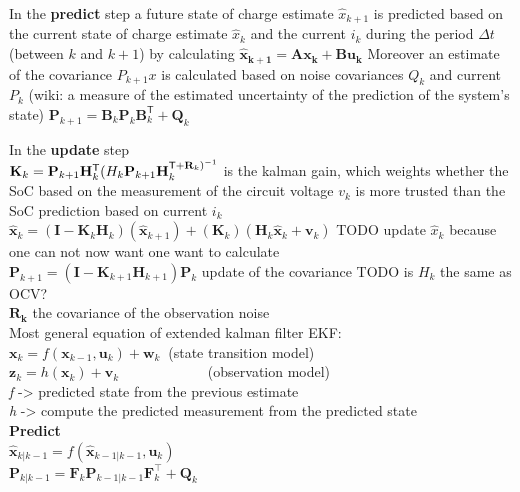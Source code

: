 In the \textbf{predict} step a future state of charge estimate  $\hat x_{k+1}$ is predicted based on the current state of charge estimate $\hat x_k$ and the current $i_k$ during the period $\Delta t$ (between $k$ and $k+1$) by calculating $ \mathbf{\hat x_{k+1}=Ax_{k}+Bu_{k}} $ Moreover an estimate of the covariance $P_{k+1}x$ is calculated based on noise covariances $Q_k$ and current $P_k$ (wiki: a measure of the estimated uncertainty of the prediction of the system's state)  $\mathbf {P} _{k+1}=\mathbf {B} _{k}\mathbf {P} _{k}\mathbf {B} _{k}^{\textsf {T}}+\mathbf {Q} _{k} $

In the \textbf{update} step  \\
$ \mathbf {K} _{k}=\mathbf {P} _{k+1}\mathbf {H} _{k}^ \textsf {T} (  \mathbf \mathbf {H} _{k}\mathbf {P} _{k+1}\mathbf {H} _{k}^{\textsf {T}+\mathbf {R} _{k})^{-1}}$  is the kalman gain, which weights whether the SoC based on the measurement of the circuit voltage $v_k$ is more trusted than the SoC prediction based on current $i_k$ \\
$ {\hat {\mathbf {x} }}_{k}=(\mathbf {I} -\mathbf {K} _{k}\mathbf {H} _{k})({\hat {\mathbf {x} }}_{k+1})+(\mathbf {K} _{k})(\mathbf {H} _{k}\mathbf {\hat x} _{k}+\mathbf {v} _{k}) $ TODO update $\hat x_k$ because one can not now want one want to calculate\\  

$ \mathbf {P} _{k+1}=\left(\mathbf {I} -\mathbf {K} _{k+1}\mathbf {H} _{k+1}\right)\mathbf {P} _{k} $ update of the covariance TODO is $H_{k}$ the same as OCV? \\

$\mathbf{R_k}$ the covariance of the observation noise  \\

Most general equation of extended kalman filter EKF: \\

$ \mathbf {x}_{k}=f(\mathbf {x} _{k-1},\mathbf {u}_{k})+\mathbf {w}_{k}\ $ (state transition model) \\
$\mathbf {z}_{k}=h(\mathbf {x} _{k})+\mathbf {v}_{k}$ \ \ \ \ \ \ \ \ \ \ \  \ (observation model)  \\
\emph{f} ->  predicted state from the previous estimate  \\
\emph{h} ->  compute the predicted measurement from the predicted state \\


\textbf{Predict} \\
${\displaystyle {\hat {\boldsymbol {x}}}_{k|k-1}=f({\hat {\boldsymbol {x}}}_{k-1|k-1},{\boldsymbol {u}}_{k})} $ \\
${\displaystyle {\boldsymbol {P}}_{k|k-1}={{\boldsymbol {F}}_{k}}{\boldsymbol {P}}_{k-1|k-1}{{\boldsymbol {F}}_{k}^{\top }}+{\boldsymbol {Q}}_{k}}$ \\

